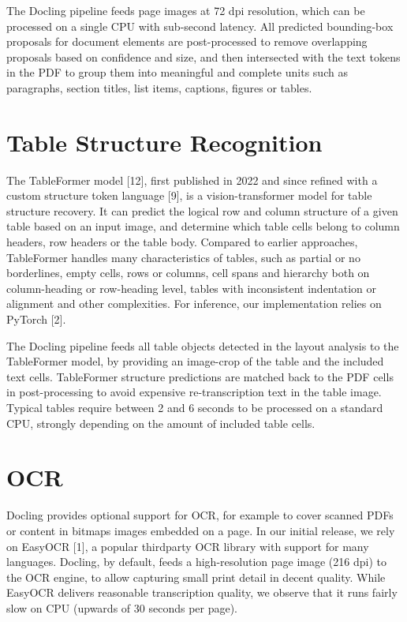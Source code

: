 \documentclass[11pt,a4paper]{article}
\begin{document}
The Docling pipeline feeds page images at 72 dpi resolution, which can be processed on a single CPU with sub-second latency. All predicted bounding-box proposals for document elements are post-processed to remove overlapping proposals based on confidence and size, and then intersected with the text tokens in the PDF to group them into meaningful and complete units such as paragraphs, section titles, list items, captions, figures or tables.

\section{Table Structure Recognition}

The TableFormer model [12], first published in 2022 and since refined with a custom structure token language [9], is a vision-transformer model for table structure recovery. It can predict the logical row and column structure of a given table based on an input image, and determine which table cells belong to column headers, row headers or the table body. Compared to earlier approaches, TableFormer handles many characteristics of tables, such as partial or no borderlines, empty cells, rows or columns, cell spans and hierarchy both on column-heading or row-heading level, tables with inconsistent indentation or alignment and other complexities. For inference, our implementation relies on PyTorch [2].

The Docling pipeline feeds all table objects detected in the layout analysis to the TableFormer model, by providing an image-crop of the table and the included text cells. TableFormer structure predictions are matched back to the PDF cells in post-processing to avoid expensive re-transcription text in the table image. Typical tables require between 2 and 6 seconds to be processed on a standard CPU, strongly depending on the amount of included table cells.

\section{OCR}

Docling provides optional support for OCR, for example to cover scanned PDFs or content in bitmaps images embedded on a page. In our initial release, we rely on EasyOCR [1], a popular thirdparty OCR library with support for many languages. Docling, by default, feeds a high-resolution page image (216 dpi) to the OCR engine, to allow capturing small print detail in decent quality. While EasyOCR delivers reasonable transcription quality, we observe that it runs fairly slow on CPU (upwards of 30 seconds per page).
\end{document}
